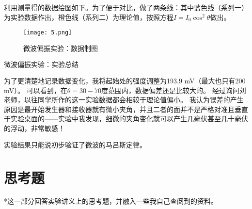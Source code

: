 \documentclass[11pt]{article}
\begin{document}
利用测量得的数据绘图如下。为了便于对比，做了两条线：其中蓝色线（系列一）为实验数据作出，橙色线（系列二）为理论值，按照方程$I=I_0\cos^2 \theta$做出。
\begin{figure}[H]
    \centering
    \texttt{[image: 5.png]}
    \caption{微波偏振实验：数据制图}
\end{figure}

\begin{center}
    \begin{tcolorbox}[colback=gray!10,%
                      colframe=black,%
                      width=5cm,%
                      arc=1mm, auto outer arc,
                      boxrule=0.5pt,
                     ]
  微波偏振实验：实验总结
    \end{tcolorbox}
\end{center}

为了更清楚地记录数据变化，我将起始处的强度调整为193.9 mV（最大也只有200 mV）。
可以看到，在$\theta=30-70$度范围内，数据偏差还是比较大的。
经过询问刘老师，以往同学所作的这一实验数据都会相较于理论值偏小。
我认为误差的产生原因是最开始发生器和接收器就有微小夹角，并且二者的面并不是严格对准且垂直于实验桌面的——实验中我发现，细微的夹角变化就可以产生几毫伏甚至几十毫伏的浮动，非常敏感！

实验结果只能说初步验证了微波的马吕斯定律。



















\newpage

\section{思考题}

*这一部分回答实验讲义上的思考题，并融入一些我自己查阅到的资料。
\end{document}
